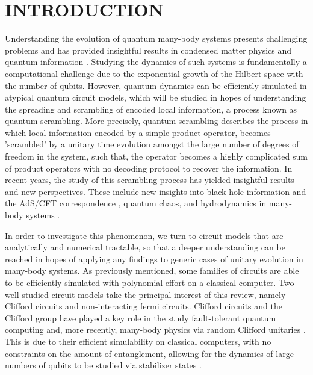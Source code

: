\section{INTRODUCTION}
Understanding the evolution of quantum many-body systems presents challenging problems and has
provided insightful results in condensed matter physics and quantum information \cite{Polkovnikov_2011}.
Studying the dynamics of such systems is fundamentally
a computational challenge due to the exponential growth of the Hilbert space with the number of
qubits. However, quantum dynamics can be efficiently simulated in atypical quantum circuit models,
which will be studied in hopes of understanding the spreading and scrambling of encoded local information,
a process known as quantum scrambling. More precisely, quantum scrambling describes the
process in which local information encoded by a simple product operator, becomes 'scrambled' by a
unitary time evolution amongst the large number of degrees of freedom in the system, such that, the
operator becomes a highly complicated sum of product operators with no decoding protocol to recover
the information. In recent years, the study of this scrambling process has yielded insightful
results and new perspectives. These include new insights into black hole information and the
AdS/CFT correspondence \cite{Calabrese_2009,Jerusalem,Jensen_2016,https://doi.org/10.48550/arxiv.1802.01198,Sekino_2008,ShenkerBlackHolesButterfly2014, Nozaki_2014},
quantum chaos, \cite{Maldacena_2016} and hydrodynamics in many-body systems \cite{Khemani_2018, PhysRevX.8.021013, PhysRevX.8.031058,Grozdanov_2018, Blake_2018}.

In order to investigate this phenomenon, we turn to circuit models that are analytically and
numerical tractable, so that a deeper understanding can be reached in hopes of applying any findings
to generic cases of unitary
evolution in many-body systems. As previously mentioned, some families of circuits are able to be efficiently
simulated with polynomial effort on a classical computer. Two well-studied circuit models take the principal interest of
this review, namely Clifford circuits and non-interacting fermi circuits. Clifford circuits and the Clifford
group have played a key role in the study fault-tolerant quantum computing and, more recently, many-body physics via
random Clifford unitaries \cite{PhysRevB.98.205136, https://doi.org/10.48550/arxiv.2110.02988}.
This is due to their efficient simulability on classical computers, with no constraints on the amount of entanglement,
allowing for the dynamics of large numbers of qubits to be studied via stabilizer states \cite{https://doi.org/10.48550/arxiv.2210.10129}.

